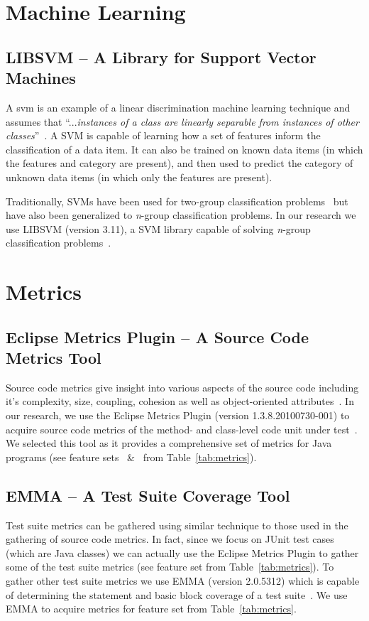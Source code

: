 \section{Machine Learning}
\label{sec:background_machine_learning}


\subsection{LIBSVM -- A Library for Support Vector Machines}
\label{subsec:background_libsvm}
A \gls{svm} is an example of a linear discrimination machine learning technique and assumes that ``...\emph{instances of a class are linearly separable from instances of other classes}''~\cite{ALP04}. A SVM is capable of learning how a set of features inform the classification of a data item. It can also be trained on known data items (in which the features and category are present), and then used to predict the category of  unknown data items (in which only the features are present).

Traditionally, SVMs have been used for two-group classification problems~\cite{CV95} but have also been generalized to \emph{n}-group classification problems. In our research we use LIBSVM (version 3.11), a SVM library capable of solving \emph{n}-group classification problems~\cite{CL11}.


\section{Metrics}
\label{sec:background_metrics}


\subsection{Eclipse Metrics Plugin -- A Source Code Metrics Tool}
\label{subsec:background_metrics_plugin}
Source code metrics give insight into various aspects of the source code including it's complexity, size, coupling, cohesion as well as object-oriented attributes~\cite{SCE05,McCa76,Kan02,HWY09,Hend95,SRD12}. In our research, we use the Eclipse Metrics Plugin (version 1.3.8.20100730-001) to acquire source code metrics of the method- and class-level code unit under test~\cite{Metrics}. We selected this tool as it provides a comprehensive set of metrics for Java programs (see feature sets ~\&~ from Table~\ref{tab:metrics}).


\subsection{EMMA -- A Test Suite Coverage Tool}
\label{subsec:background_emma}
Test suite metrics can be gathered using similar technique to those used in the gathering of source code metrics. In fact, since we focus on JUnit test cases (which are Java classes) we can actually use the Eclipse Metrics Plugin to gather some of the test suite metrics (see feature set  from Table~\ref{tab:metrics}). To gather other test suite metrics we use EMMA (version 2.0.5312) which is capable of determining the statement and basic block coverage of a test suite~\cite{EMMA}. We use EMMA to acquire metrics for feature set  from Table~\ref{tab:metrics}.

